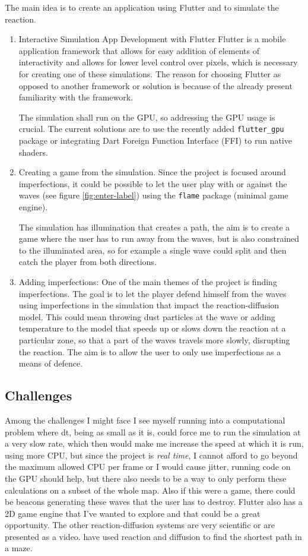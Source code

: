 The main idea is to create an application using Flutter and to simulate the reaction. 
\begin{enumerate}
    \item Interactive Simulation App Development with Flutter
    Flutter is a mobile application framework that allows for easy addition of elements of interactivity and allows for lower level control over pixels, which is necessary for creating one of these simulations. The reason for choosing Flutter as opposed to another framework or solution is because of the already present familiarity with the framework. 

    The simulation shall run on the GPU, so addressing the GPU usage is crucial. The current solutions are to use the recently added \verb|flutter_gpu| package or integrating Dart Foreign Function Interface (FFI) to run native shaders. 
    \item Creating a game from the simulation. Since the project is focused around imperfections, it could be possible to let the user play with or against the waves (see figure \ref{fig:enter-label}) using the \verb|flame| package (minimal game engine). 

    The simulation has illumination that creates a path, the aim is to create a game where the user has to run away from the waves, but is also constrained to the illuminated area, so for example a single wave could split and then catch the player from both directions. 

    \item Adding imperfections:
    One of the main themes of the project is finding imperfections. The goal is to let the player defend himself from the waves using imperfections in the simulation that impact the reaction-diffusion model. This could mean throwing dust particles at the wave or adding temperature to the model that speeds up or slows down the reaction at a particular zone, so that a part of the waves travels more slowly, disrupting the reaction. The aim is to allow the user to only use imperfections as a means of defence. 
\end{enumerate}

\subsection{Challenges}
Among the challenges I might face I see myself running into a computational problem where dt, being as small as it is, could force me to run the simulation at a very slow rate, which then would make me increase the speed at which it is run, using more CPU, but since the project is \textit{real time}, I cannot afford to go beyond the maximum allowed CPU per frame or I would cause jitter, running code on the GPU should help, but there also needs to be a way to only perform these calculations on a subset of the whole map. Also if this were a game, there could be beacons generating these waves that the user has to destroy. Flutter also has a 2D game engine that I've wanted to explore and that could be a great opportunity. 
The other reaction-diffusion systems are very scientific or are presented as a video. \cite{doi:10.1021/jp509474w} have used reaction and diffusion to find the shortest path in a maze. 

